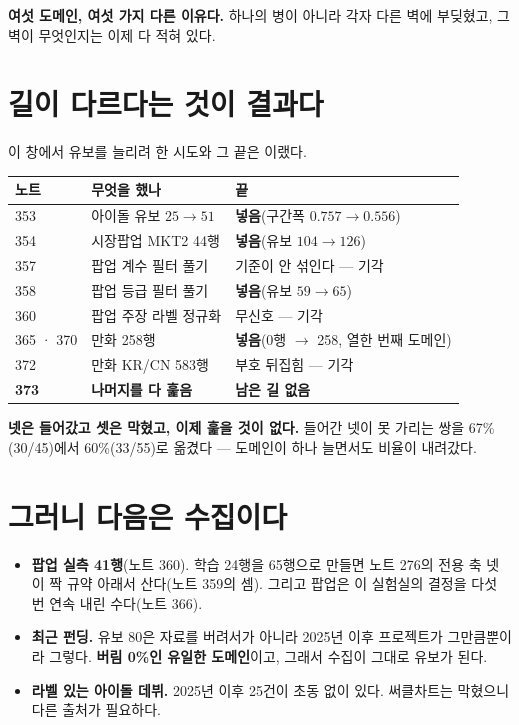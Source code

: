 \documentclass[11pt]{article}
\begin{document}
\textbf{여섯 도메인, 여섯 가지 다른 이유다.} 하나의 병이 아니라 각자
다른 벽에 부딪혔고, 그 벽이 무엇인지는 이제 다 적혀 있다.

\section{길이 다르다는 것이 결과다}

이 창에서 유보를 늘리려 한 시도와 그 끝은 이랬다.

\begin{center}
\begin{tabular}{lll}
\hline
노트 & 무엇을 했나 & 끝 \\
\hline
353 & 아이돌 유보 $25 \to 51$ & \textbf{넣음}(구간폭 $0.757 \to 0.556$) \\
354 & 시장팝업 MKT2 44행 & \textbf{넣음}(유보 $104 \to 126$) \\
357 & 팝업 계수 필터 풀기 & 기준이 안 섞인다 --- 기각 \\
358 & 팝업 등급 필터 풀기 & \textbf{넣음}(유보 $59 \to 65$) \\
360 & 팝업 주장 라벨 정규화 & 무신호 --- 기각 \\
365 · 370 & 만화 258행 & \textbf{넣음}(0행 $\to$ 258, 열한 번째 도메인) \\
372 & 만화 KR/CN 583행 & 부호 뒤집힘 --- 기각 \\
\textbf{373} & \textbf{나머지를 다 훑음} & \textbf{남은 길 없음} \\
\hline
\end{tabular}
\end{center}

\textbf{넷은 들어갔고 셋은 막혔고, 이제 훑을 것이 없다.} 들어간 넷이
못 가리는 쌍을 67\%(30/45)에서 60\%(33/55)로 옮겼다 --- 도메인이 하나
늘면서도 비율이 내려갔다.

\section{그러니 다음은 수집이다}

\begin{itemize}
\item \textbf{팝업 실측 41행}(노트 360). 학습 24행을 65행으로 만들면 노트
276의 전용 축 넷이 짝 규약 아래서 산다(노트 359의 셈). 그리고 팝업은
이 실험실의 결정을 다섯 번 연속 내린 수다(노트 366).
\item \textbf{최근 펀딩.} 유보 80은 자료를 버려서가 아니라 2025년 이후
프로젝트가 그만큼뿐이라 그렇다. \textbf{버림 0\%인 유일한 도메인}이고,
그래서 수집이 그대로 유보가 된다.
\item \textbf{라벨 있는 아이돌 데뷔.} 2025년 이후 25건이 초동 없이 있다.
써클차트는 막혔으니 다른 출처가 필요하다.
\end{itemize}
\end{document}
